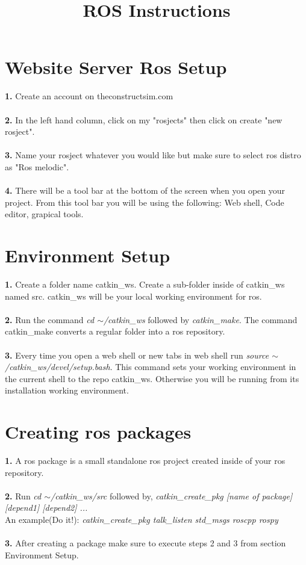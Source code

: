 \documentclass{article}
\title{ROS Instructions}
\author{}
\date{}
\begin{document}
\maketitle

\section{Website Server Ros Setup}
\textbf{1.} Create an account on theconstructsim.com\\\\
\textbf{2.} In the left hand column, click on my "rosjects" then click on create "new rosject".\\\\
\textbf{3.} Name your rosject whatever you would like but make sure to select ros distro as "Ros melodic".\\\\
\textbf{4.} There will be a tool bar at the bottom of the screen when you open your project. From this tool bar you will be using the following: Web shell, Code editor, grapical tools.

\section{Environment Setup}
\textbf{1.} Create a folder name catkin\_ws. Create a sub-folder inside of catkin\_ws named src. catkin\_ws will be your local working environment for ros.\\\\
\textbf{2.} Run the command \emph{cd $\sim$/catkin\_ws} followed by \emph{catkin\_make}. The command catkin\_make converts a regular folder into a ros repository.\\\\
\textbf{3.} Every time you open a web shell or new tabs in web shell run \emph{source $\sim$/catkin\_ws/devel/setup.bash}. This command sets your working environment in the current shell to the repo catkin\_ws. Otherwise you will be running from its installation working environment. 

\section{Creating ros packages}
\textbf{1.} A ros package is a small standalone ros project created inside of your ros repository.\\\\
\textbf{2.}  Run \emph{cd $\sim$/catkin\_ws/src} followed by, \emph{catkin\_create\_pkg [name of package] [depend1] [depend2] ...}\\
An example(Do it!): \emph{catkin\_create\_pkg talk\_listen std\_msgs roscpp rospy}\\\\
\textbf{3.} After creating a package make sure to execute steps 2 and 3 from section Environment Setup.
\end{document}
